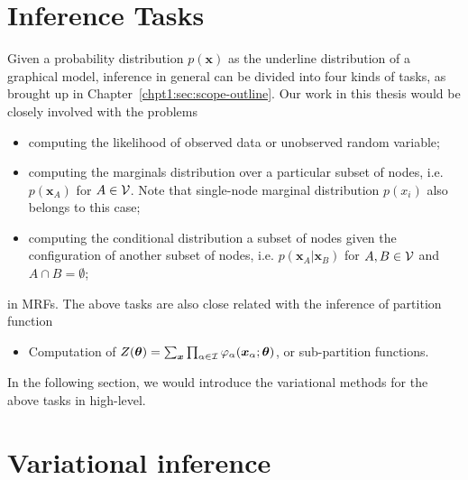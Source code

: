 \section{Inference Tasks}


Given a probability distribution $p(\bm{x})$ as the underline distribution of a graphical model, inference in general can be divided into four kinds of tasks, as brought up in Chapter~\ref{chpt1:sec:scope-outline}. Our work in this thesis would be closely involved with the problems
\begin{itemize}
\item computing the likelihood of observed data or unobserved random variable;
\item computing the marginals distribution over a particular subset of nodes, i.e. $p(\bm{x}_A)$ for $A \in \mathcal{V}$. Note that single-node marginal distribution $p(x_i)$ also belongs to this case;
\item computing the conditional distribution a subset of nodes given the configuration of another subset of nodes, i.e. $p(\bm{x}_A| \bm{x}_B)$ for $A, B \in \mathcal{V}$ and $A \cap B = \emptyset$;
\end{itemize}
in MRFs. The above tasks are also close related with the inference of partition function
\begin{itemize}
\item Computation of $Z(\bm{\theta}) = \sum_{\bm{x}} \prod_{\alpha \in \mathcal{I}} \varphi_{\alpha}(\bm{x}_{\alpha};\bm{\theta})$, or sub-partition functions.
\end{itemize}

In the following section, we would introduce the variational methods for the above tasks in high-level.


\section{Variational inference}
\label{chpt2:sec:variational-inference}

